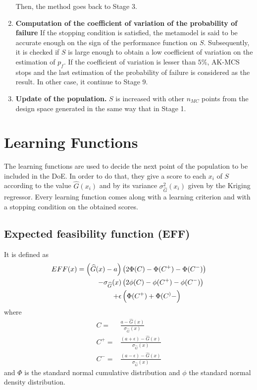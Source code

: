 \begin{enumerate}
    Then, the method goes back to Stage 3.
    \item \textbf{Computation of the coefficient of variation of the probability of
    failure} If the stopping condition is satisfied, the metamodel is said to be
    accurate enough on the sign of the performance function on $S$. Subsequently,
    it is checked if $S$ is large enough to obtain a low coefficient of variation
    on the estimation of $p_f$. If the coefficient of variation is lesser than
    $5\%$, AK-MCS stops and the last estimation of the probability of failure is
    considered as the result. In other case, it continue to Stage 9.
    \item \textbf{Update of the population.} $S$ is increased with other $n_{MC}$ points from the
    design space generated in the same way that in Stage 1.
\end{enumerate} 

\section{Learning Functions}
The learning functions are used to decide the next point of the population to be
included in the DoE. In order to do that, they give a score to each $x_i$ of $S$
according to the value $\widehat{G}(x_i)$ and by its variance $\sigma^2_{\widehat{G}}(x_i)$
given by the Kriging regressor. Every learning function comes along with a learning criterion
and with a stopping condition on the obtained scores.

\subsection{Expected feasibility function (EFF)}
It is defined as
\begin{align}
    EFF(x)= \left( \widehat{G}(x) - a \right)& \left( 2 \Phi (C) - \Phi (C^+) - \Phi (C^-) \right) \nonumber\\
- \sigma_{\widehat{G}}(x) & \left( 2 \phi (C) - \phi (C^+) - \phi (C^-) \right) \\
+ \epsilon & \left( \Phi (C^+) + \Phi (C^)- \right)\nonumber
\end{align}
where
\begin{align*}
    C =& \frac{a-\widehat{G}(x)}{\sigma_{\widehat{G}}(x)} \\
    C^+ =& \frac{(a + \epsilon)-\widehat{G}(x)}{\sigma_{\widehat{G}}(x)} \\
    C^- =& \frac{(a - \epsilon)-\widehat{G}(x)}{\sigma_{\widehat{G}}(x)}
\end{align*}
and $\Phi$ is the standard normal cumulative distribution and $\phi$ the standard
normal density distribution. \\

